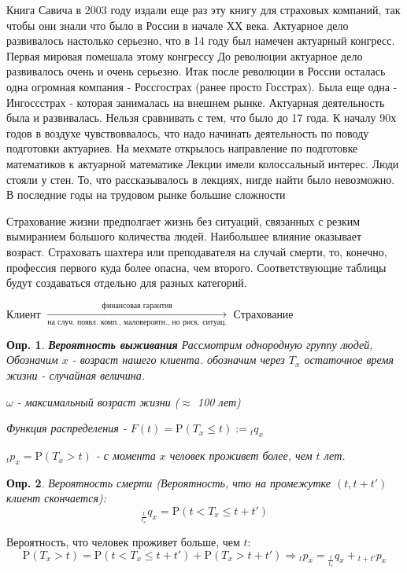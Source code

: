 \documentclass[10pt]{article}
\newtheorem{definition}{Опр.}
\theoremstyle{theorem}
\newcommand\defin[1]{\textbf{#1}}
\def\P{
    \mathrm{P}
}
\begin{document}
    Книга Савича в 2003 году издали еще раз эту книгу для страховых компаний, так чтобы они 
    знали что было  в России в начале ХХ века.
    Актуарное дело развивалось настолько серьезно, что в 14 году был намечен
    актуарный конгресс. Первая мировая помешала этому конгрессу
    До революции актуарное дело развивалось очень и очень серьезно.
    Итак после революции в России осталась одна огромная компания - Россгострах (ранее просто Госстрах).
    Была еще одна - Ингоссстрах - которая занималась на внешнем рынке.
    Актуарная деятельность была и развивалась.
    Нельзя сравнивать с тем, что было до 17 года.
    К началу 90х годов в воздухе чувствоввалось, что надо начинать деятельность по поводу
    подготовки актуариев.
    На мехмате открылось направление по подготовке математиков к актуарной математике
    Лекции имели колоссальный интерес. Люди стояли у стен. То, что рассказывалось в лекциях, нигде найти было
    невозможно.
    В последние годы на трудовом рынке большие сложности
    

        Страхование жизни предполгает жизнь без ситуаций, связанных с резким вымиранием большого количества людей.
        Наибольшее влияние оказывает возраст.
        Страховать шахтера или преподавателя на случай смерти, то, конечно, профессия первого куда
        более опасна, чем второго. Соответствующие таблицы будут создаваться отдельно
        для разных категорий.

    Клиент $\xrightarrow[\mbox{на случ. появл. комп., маловероятн., но риск. ситуац.}]{\mbox{финансовая гарантия}}$ Страхование

    \begin{definition}
        \defin{Вероятность выживания}
        Рассмотрим однородную группу людей,
        Обозначим $x$  - возраст нашего клиента. 
        обозначим через $T_x$ остаточное время жизни - случайная величина.

        $\omega$ - максимальный возраст жизни ($\approx$ 100 лет)

        Функция распределения - $F(t) = \P(T_x \leq t) := {}_tq_x$

        ${}_tp_x = \P(T_x > t)$ - с момента $x$ человек проживет более, чем $t$ лет.

    \end{definition}

    \begin{definition}
        Вероятность смерти (Вероятность, что на промежутке $(t, t + t')$ клиент скончается): 
        $${}_{\frac{t}{t_x}}q_x = \P(t < T_x \leq t + t')$$

    \end{definition}
    Вероятность, что человек проживет больше, чем $t$: 
    $$\P(T_x > t) = \P(t < T_x \leq t + t') + \P(T_x > t + t')  \Rightarrow {}_tp_x = {}_{\frac{t}{t_x}}q_x + {}_{t+ t'}p_x$$
\end{document}
